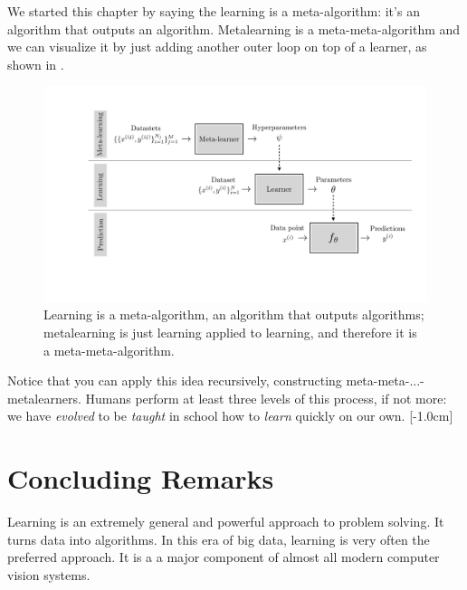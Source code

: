 We started this chapter by saying the learning is a meta-algorithm: it's an algorithm that outputs an algorithm. Metalearning is a meta-meta-algorithm and we can visualize it by just adding another outer loop on top of a learner, as shown in \fig{\ref{fig:intro_to_learning:meta_learning_diagram}}.
\begin{figure}[h]
    \centerline{
        \includegraphics[width=1.0\linewidth]{./figures/intro_to_learning/meta_learning_diagram.pdf}
    }
    \caption{Learning is a meta-algorithm, an algorithm that outputs algorithms; metalearning is just learning applied to learning, and therefore it is a meta-meta-algorithm.}
    \label{fig:intro_to_learning:meta_learning_diagram}
\end{figure}

Notice that you can apply this idea recursively, constructing meta-meta-...-metalearners. Humans perform at least three levels of this process, if not more: we have \emph{evolved} to be \emph{taught} in school how to \emph{learn} quickly on our own.
[-1.0cm]

\section{Concluding Remarks}
Learning is an extremely general and powerful approach to problem solving. It turns data into algorithms. In this era of big data, learning is very often the preferred approach. It is a a major component of almost all modern computer vision systems.
